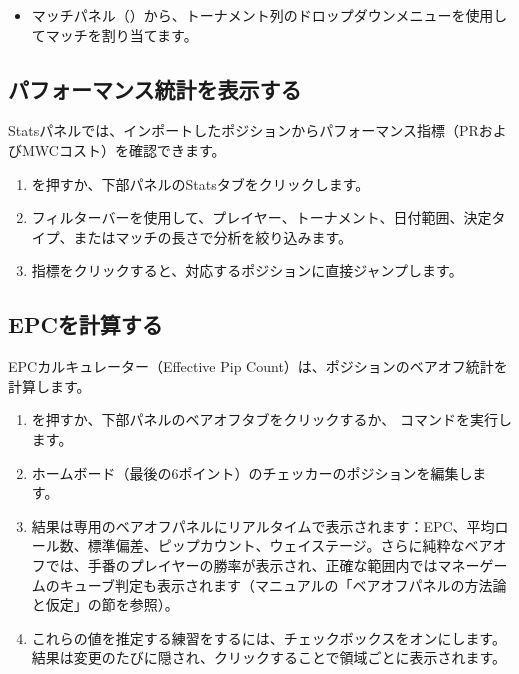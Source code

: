 \documentclass[letterpaper,10pt,dvipdfmx]{sphinxmanual}
\begin{document}
\sphinxAtStartPar
{}
\begin{itemize}
\item {} 
\sphinxAtStartPar
マッチパネル（）から、トーナメント列のドロップダウンメニューを使用してマッチを割り当てます。

\end{itemize}


\subsection{パフォーマンス統計を表示する}
\label{\detokenize{guide_utilisateur:afficher-les-statistiques-de-performance}}
\sphinxAtStartPar
Statsパネルでは、インポートしたポジションからパフォーマンス指標（PRおよびMWCコスト）を確認できます。
\begin{enumerate}
%
\item {} 
\sphinxAtStartPar
{} を押すか、下部パネルのStatsタブをクリックします。

\item {} 
\sphinxAtStartPar
フィルターバーを使用して、プレイヤー、トーナメント、日付範囲、決定タイプ、またはマッチの長さで分析を絞り込みます。

\item {} 
\sphinxAtStartPar
指標をクリックすると、対応するポジションに直接ジャンプします。

\end{enumerate}


\subsection{EPCを計算する}
\label{\detokenize{guide_utilisateur:calculer-l-epc}}
\sphinxAtStartPar
EPCカルキュレーター（Effective Pip Count）は、ポジションのベアオフ統計を計算します。
\begin{enumerate}
%
\item {} 
\sphinxAtStartPar
{} を押すか、下部パネルのベアオフタブをクリックするか、 コマンドを実行します。

\item {} 
\sphinxAtStartPar
ホームボード（最後の6ポイント）のチェッカーのポジションを編集します。

\item {} 
\sphinxAtStartPar
結果は専用のベアオフパネルにリアルタイムで表示されます：EPC、平均ロール数、標準偏差、ピップカウント、ウェイステージ。さらに純粋なベアオフでは、手番のプレイヤーの勝率が表示され、正確な範囲内ではマネーゲームのキューブ判定も表示されます（マニュアルの「ベアオフパネルの方法論と仮定」の節を参照）。

\item {} 
\sphinxAtStartPar
これらの値を推定する練習をするには、チェックボックスをオンにします。結果は変更のたびに隠され、クリックすることで領域ごとに表示されます。

\end{enumerate}
\end{document}
